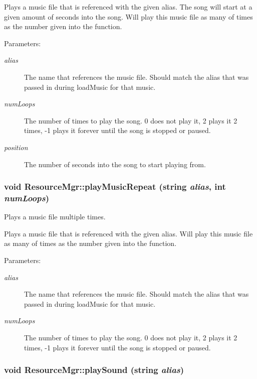 Plays a music file that is referenced with the given alias. The song will start at a given amount of seconds into the song. Will play this music file as many of times as the number given into the function. \begin{Desc}
\item[Parameters:]
\begin{description}
\item[{\em alias}]The name that references the music file. Should match the alias that was passed in during loadMusic for that music. \item[{\em numLoops}]The number of times to play the song. 0 does not play it, 2 plays it 2 times, -1 plays it forever until the song is stopped or paused. \item[{\em position}]The number of seconds into the song to start playing from. \end{description}
\end{Desc}
\hypertarget{class_resource_mgr_c07602fe156a2903fa6bbcb679ef74ea}{
\subsubsection[{playMusicRepeat}]{\setlength{\rightskip}{0pt plus 5cm}void ResourceMgr::playMusicRepeat (string {\em alias}, \/  int {\em numLoops})}}
\label{class_resource_mgr_c07602fe156a2903fa6bbcb679ef74ea}


Plays a music file multiple times. 

Plays a music file that is referenced with the given alias. Will play this music file as many of times as the number given into the function. \begin{Desc}
\item[Parameters:]
\begin{description}
\item[{\em alias}]The name that references the music file. Should match the alias that was passed in during loadMusic for that music. \item[{\em numLoops}]The number of times to play the song. 0 does not play it, 2 plays it 2 times, -1 plays it forever until the song is stopped or paused. \end{description}
\end{Desc}
\hypertarget{class_resource_mgr_1122bf9ce3cbcebc6978efa63904dcac}{
\subsubsection[{playSound}]{\setlength{\rightskip}{0pt plus 5cm}void ResourceMgr::playSound (string {\em alias})}}
\label{class_resource_mgr_1122bf9ce3cbcebc6978efa63904dcac}


